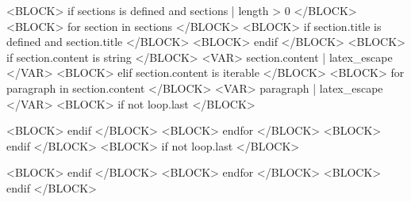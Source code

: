 
<BLOCK> if sections is defined and sections | length > 0 </BLOCK>
<BLOCK> for section in sections </BLOCK>
<BLOCK> if section.title is defined and section.title </BLOCK>
<BLOCK> endif </BLOCK>
<BLOCK> if section.content is string </BLOCK>
<VAR> section.content | latex_escape </VAR>
<BLOCK> elif section.content is iterable </BLOCK>
<BLOCK> for paragraph in section.content </BLOCK>
<VAR> paragraph | latex_escape </VAR>
<BLOCK> if not loop.last </BLOCK>

<BLOCK> endif </BLOCK>
<BLOCK> endfor </BLOCK>
<BLOCK> endif </BLOCK>
<BLOCK> if not loop.last </BLOCK>

<BLOCK> endif </BLOCK>
<BLOCK> endfor </BLOCK>
<BLOCK> endif </BLOCK>
